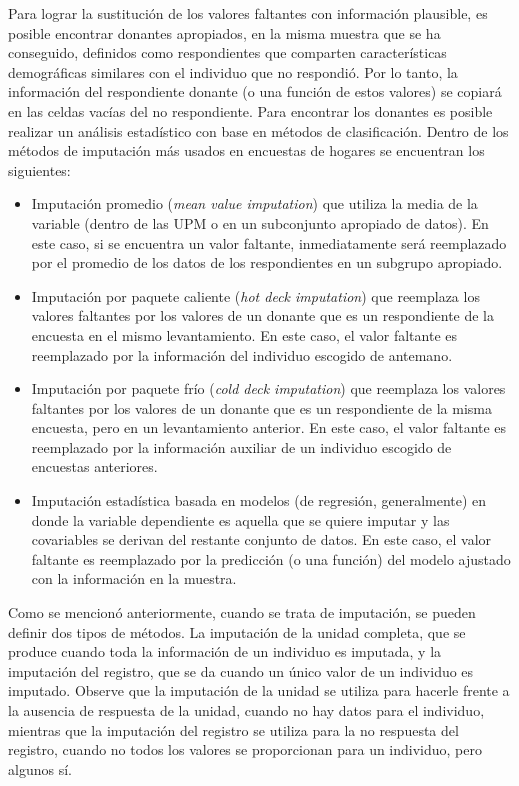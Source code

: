 \documentclass[
  10pt,
  spanish,
]{book}
\providecommand{\tightlist}{%
  \setlength{\itemsep}{0pt}\setlength{\parskip}{0pt}}
\begin{document}
Para lograr la sustitución de los valores faltantes con información plausible, es posible encontrar donantes apropiados, en la misma muestra que se ha conseguido, definidos como respondientes que comparten características demográficas similares con el individuo que no respondió. Por lo tanto, la información del respondiente donante (o una función de estos valores) se copiará en las celdas vacías del no respondiente. Para encontrar los donantes es posible realizar un análisis estadístico con base en métodos de clasificación. Dentro de los métodos de imputación más usados en encuestas de hogares se encuentran los siguientes:

\begin{itemize}
\tightlist
\item
  Imputación promedio (\emph{mean value imputation}) que utiliza la media de la variable (dentro de las UPM o en un subconjunto apropiado de datos). En este caso, si se encuentra un valor faltante, inmediatamente será reemplazado por el promedio de los datos de los respondientes en un subgrupo apropiado.
\item
  Imputación por paquete caliente (\emph{hot deck imputation}) que reemplaza los valores faltantes por los valores de un donante que es un respondiente de la encuesta en el mismo levantamiento. En este caso, el valor faltante es reemplazado por la información del individuo escogido de antemano.
\item
  Imputación por paquete frío (\emph{cold deck imputation}) que reemplaza los valores faltantes por los valores de un donante que es un respondiente de la misma encuesta, pero en un levantamiento anterior. En este caso, el valor faltante es reemplazado por la información auxiliar de un individuo escogido de encuestas anteriores.
\item
  Imputación estadística basada en modelos (de regresión, generalmente) en donde la variable dependiente es aquella que se quiere imputar y las covariables se derivan del restante conjunto de datos. En este caso, el valor faltante es reemplazado por la predicción (o una función) del modelo ajustado con la información en la muestra.
\end{itemize}

Como se mencionó anteriormente, cuando se trata de imputación, se pueden definir dos tipos de métodos. La imputación de la unidad completa, que se produce cuando toda la información de un individuo es imputada, y la imputación del registro, que se da cuando un único valor de un individuo es imputado. Observe que la imputación de la unidad se utiliza para hacerle frente a la ausencia de respuesta de la unidad, cuando no hay datos para el individuo, mientras que la imputación del registro se utiliza para la no respuesta del registro, cuando no todos los valores se proporcionan para un individuo, pero algunos sí.
\end{document}
